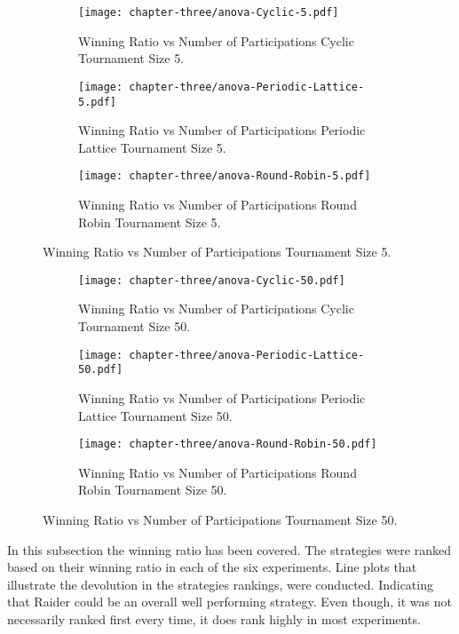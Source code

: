 \begin{figure}[H]
	\centering

	\begin{subfigure}[t]{0.75\textwidth}
		\centering
		\texttt{[image: chapter-three/anova-Cyclic-5.pdf]}
		\caption{Winning Ratio vs Number of Participations Cyclic Tournament Size 5.}
	\end{subfigure}
	\hfill
	\begin{subfigure}[t]{0.75\textwidth}\centering
		\centering
		\texttt{[image: chapter-three/anova-Periodic-Lattice-5.pdf]}
		\caption{Winning Ratio vs Number of Participations Periodic Lattice Tournament Size 5.}
	\end{subfigure}
	\hfill
	\begin{subfigure}[t]{0.75\textwidth}\centering
		\centering
		\texttt{[image: chapter-three/anova-Round-Robin-5.pdf]}
		\caption{Winning Ratio vs Number of Participations Round Robin Tournament Size 5.}
	\end{subfigure}
	\caption{Winning Ratio vs Number of Participations Tournament Size 5.}
	\label{fig:winning-ratio-participations-five}
\end{figure}

\begin{figure}[H]
	\centering

	\begin{subfigure}[t]{0.75\textwidth}
		\centering
		\texttt{[image: chapter-three/anova-Cyclic-50.pdf]}
		\caption{Winning Ratio vs Number of Participations Cyclic Tournament Size 50.}
	\end{subfigure}
	\hfill
	\begin{subfigure}[t]{0.75\textwidth}\centering
		\centering
		\texttt{[image: chapter-three/anova-Periodic-Lattice-50.pdf]}
		\caption{Winning Ratio vs Number of Participations Periodic Lattice Tournament Size 50.}
	\end{subfigure}
	\hfill
	\begin{subfigure}[t]{0.75\textwidth}\centering
		\centering
		\texttt{[image: chapter-three/anova-Round-Robin-50.pdf]}
		\caption{Winning Ratio vs Number of Participations Round Robin Tournament Size 50.}
	\end{subfigure}
	\caption{Winning Ratio vs Number of Participations Tournament Size 50.}
	\label{fig:winning-ratio-participations-fifty}
\end{figure}

In this subsection the winning ratio has been covered. The strategies were ranked
based on their winning ratio in each of the six experiments. Line plots that
illustrate the devolution in the strategies rankings, were conducted. Indicating
that Raider could be an overall well performing strategy. Even though, it was
not necessarily ranked first every time, it does rank highly in most experiments.

